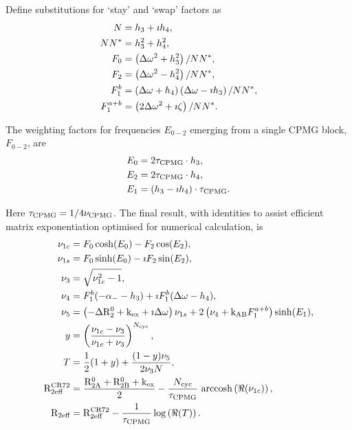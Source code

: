 Define substitutions for `stay' and `swap' factors as
\begin{subequations}
\begin{align}
	N & = h_3 + \imath h_4 , \\
	NN^* & = h_3^2 + h_4^2 , \\
	F_0 & = \left(\Delta\omega^2 + h_3^2\right) / NN^* , \\
	F_2 & = \left(\Delta\omega^2 - h_4^2\right) / NN^* , \\
	F_1^b & = \left(\Delta\omega + h_4\right) \left(\Delta\omega - \imath h_3\right) / NN^* , \\
	F_1^{a+b} & = \left(2\Delta\omega^2 + \imath \zeta\right) / NN^* .
\end{align}
\end{subequations}

The weighting factors for frequencies $E_{0-2}$ emerging from a single CPMG block, $F_{0-2}$, are
\begin{subequations}
\begin{align}
	E_0 & =  2 \tau_\textrm{CPMG} \cdot h_3 , \\
	E_2 & =  2 \tau_\textrm{CPMG} \cdot  h_4 , \\
	E_1 & = (h_3 - \imath h_4) \cdot \tau_\textrm{CPMG} .
\end{align}
\end{subequations}

Here $\tau_\textrm{CPMG} = 1 / 4\nu_\textrm{CPMG}$.
The final result, with identities to assist efficient matrix exponentiation optimised for numerical calculation, is
\begin{subequations}
\begin{align}
	\nu_{1c} & = F_0  \cosh(E_0) - F_2 \cos(E_2) , \\
	\nu_{1s} & = F_0  \sinh(E_0) - \imath F_2 \sin(E_2), \\
	\nu_3 & = \sqrt{\nu_{1c}^2 - 1} , \\
	\nu_4 & = F_1^b (-\alpha_- - h_3 ) + \imath F_1^b (\Delta\omega - h_4) , \\
	\nu_5 & =\left(-\Delta \mathrm{R}_2^0 + \textrm{k}_\textrm{ex} + \imath \Delta\omega\right) \nu_{1s} + 2 \left(\nu_4 + \textrm{k}_\textrm{AB} F_1^{a+b}\right) \sinh(E_1) , \\
    y & = \left( \frac{\nu_{1c} - \nu_3}{\nu_{1c} + \nu_3} \right) ^ {N_\textrm{cyc}} , \\
	T & = \frac{1}{2}(1 + y) + \frac{(1 - y)\nu_5}{2 \nu_3 N} , \\
	\mathrm{R}_\textrm{2eff}^{\textrm{CR72}} & = \frac{\mathrm{R}_\mathrm{2A}^0 + \mathrm{R}_\mathrm{2B}^0 + \textrm{k}_\textrm{ex}}{2} - \frac{N_\textrm{cyc}}{\tau_\textrm{CPMG}} \, \operatorname{arccosh}\left(\Re(\nu_{1c})\right) , \\
	\mathrm{R}_\textrm{2eff} & = \mathrm{R}_\textrm{2eff}^{\textrm{CR72}} - \frac{1}{\tau_\textrm{CPMG}} \log\left(\Re(T)\right) .
\end{align}
\end{subequations}

